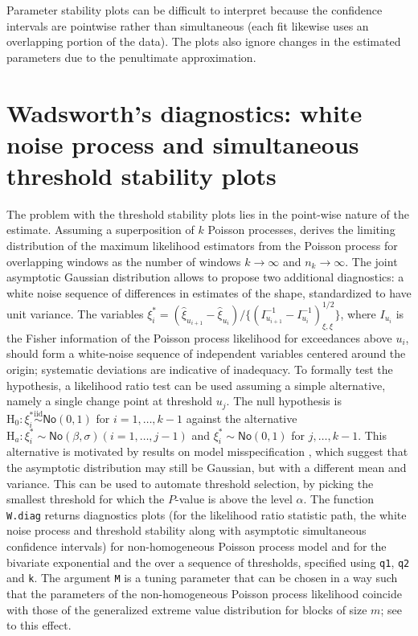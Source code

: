 \documentclass[]{book}
\begin{document}
Parameter stability plots can be difficult to interpret because the confidence intervals are pointwise rather than simultaneous (each fit likewise uses an overlapping portion of the data). The plots also ignore changes in the estimated parameters due to the penultimate approximation.

\hypertarget{wadsworths-diagnostics-white-noise-process-and-simultaneous-threshold-stability-plots}{%
\section{Wadsworth's diagnostics: white noise process and simultaneous threshold stability plots}\label{wadsworths-diagnostics-white-noise-process-and-simultaneous-threshold-stability-plots}}

The problem with the threshold stability plots lies in the point-wise nature of the estimate. Assuming a superposition of \(k\) Poisson processes, \citet{Wadsworth:2016} derives the limiting distribution of the maximum likelihood estimators from the Poisson process for overlapping windows as the number of windows \(k \to \infty\) and \(n_k \to \infty\). The joint asymptotic Gaussian distribution allows \citet{Wadsworth:2016} to propose two additional diagnostics: a white noise sequence of differences in estimates of the shape, standardized to have unit variance. The variables \(\xi^*_i=(\hat{\xi}_{u_{i+1}}-\hat{\xi}_{u_i})/\{(I^{-1}_{u_{i+1}}-I^{-1}_{u_{i}})_{\xi,\xi}^{1/2}\}\), where \(I_{u_{i}}\) is the Fisher information of the Poisson process likelihood for exceedances above \(u_i\), should form a white-noise sequence of independent variables centered around the origin; systematic deviations are indicative of inadequacy. To formally test the hypothesis, a likelihood ratio test can be used assuming a simple alternative, namely a single change point at threshold \(u_j\). The null hypothesis is \(\mathrm{H}_0: \xi_i^* \stackrel{\mathrm{iid}}{\sim}\textsf{No}(0,1)\) for \(i=1, \ldots, k-1\) against the alternative \(\mathrm{H}_a: \xi^*_i \sim \textsf{No}(\beta, \sigma) (i=1, \ldots, j-1)\) and \(\xi^*_i \sim \textsf{No}(0,1)\) for \(j, \ldots, k-1\). This alternative is motivated by results on model misspecification \citep{White:1982}, which suggest that the asymptotic distribution may still be Gaussian, but with a different mean and variance. This can be used to automate threshold selection, by picking the smallest threshold for which the \(P\)-value is above the level \(\alpha\). The function \texttt{W.diag} returns diagnostics plots (for the likelihood ratio statistic path, the white noise process and threshold stability along with asymptotic simultaneous confidence intervals) for non-homogeneous Poisson process model and for the bivariate exponential and the over a sequence of thresholds, specified using \texttt{q1}, \texttt{q2} and \texttt{k}. The argument \texttt{M} is a tuning parameter that can be chosen in a way such that the parameters of the non-homogeneous Poisson process likelihood coincide with those of the generalized extreme value distribution for blocks of size \(m\); see \citet{Coles:2001} to this effect.
\end{document}
